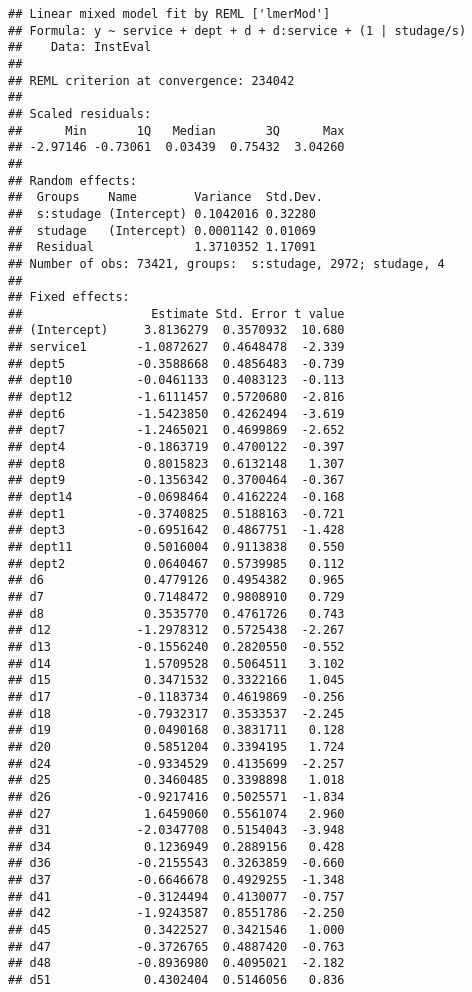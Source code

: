 \documentclass[
]{article}
\begin{document}
\begin{verbatim}
## Linear mixed model fit by REML ['lmerMod']
## Formula: y ~ service + dept + d + d:service + (1 | studage/s)
##    Data: InstEval
## 
## REML criterion at convergence: 234042
## 
## Scaled residuals: 
##      Min       1Q   Median       3Q      Max 
## -2.97146 -0.73061  0.03439  0.75432  3.04260 
## 
## Random effects:
##  Groups    Name        Variance  Std.Dev.
##  s:studage (Intercept) 0.1042016 0.32280 
##  studage   (Intercept) 0.0001142 0.01069 
##  Residual              1.3710352 1.17091 
## Number of obs: 73421, groups:  s:studage, 2972; studage, 4
## 
## Fixed effects:
##                  Estimate Std. Error t value
## (Intercept)     3.8136279  0.3570932  10.680
## service1       -1.0872627  0.4648478  -2.339
## dept5          -0.3588668  0.4856483  -0.739
## dept10         -0.0461133  0.4083123  -0.113
## dept12         -1.6111457  0.5720680  -2.816
## dept6          -1.5423850  0.4262494  -3.619
## dept7          -1.2465021  0.4699869  -2.652
## dept4          -0.1863719  0.4700122  -0.397
## dept8           0.8015823  0.6132148   1.307
## dept9          -0.1356342  0.3700464  -0.367
## dept14         -0.0698464  0.4162224  -0.168
## dept1          -0.3740825  0.5188163  -0.721
## dept3          -0.6951642  0.4867751  -1.428
## dept11          0.5016004  0.9113838   0.550
## dept2           0.0640467  0.5739985   0.112
## d6              0.4779126  0.4954382   0.965
## d7              0.7148472  0.9808910   0.729
## d8              0.3535770  0.4761726   0.743
## d12            -1.2978312  0.5725438  -2.267
## d13            -0.1556240  0.2820550  -0.552
## d14             1.5709528  0.5064511   3.102
## d15             0.3471532  0.3322166   1.045
## d17            -0.1183734  0.4619869  -0.256
## d18            -0.7932317  0.3533537  -2.245
## d19             0.0490168  0.3831711   0.128
## d20             0.5851204  0.3394195   1.724
## d24            -0.9334529  0.4135699  -2.257
## d25             0.3460485  0.3398898   1.018
## d26            -0.9217416  0.5025571  -1.834
## d27             1.6459060  0.5561074   2.960
## d31            -2.0347708  0.5154043  -3.948
## d34             0.1236949  0.2889156   0.428
## d36            -0.2155543  0.3263859  -0.660
## d37            -0.6646678  0.4929255  -1.348
## d41            -0.3124494  0.4130077  -0.757
## d42            -1.9243587  0.8551786  -2.250
## d45             0.3422527  0.3421546   1.000
## d47            -0.3726765  0.4887420  -0.763
## d48            -0.8936980  0.4095021  -2.182
## d51             0.4302404  0.5146056   0.836

\end{verbatim}
\end{document}

